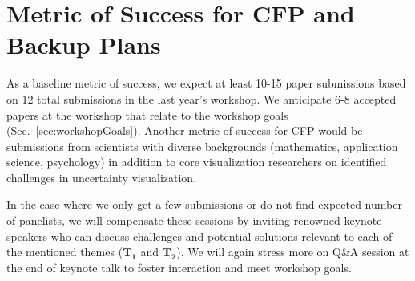 \section {Metric of Success for CFP and Backup Plans} \label{sec:backup}
As a baseline metric of success, we expect at least 10-15 paper submissions based on $12$ total submissions in the last year's workshop.  We anticipate 6-8 accepted papers at the workshop that relate to the workshop goals (Sec.~\ref{sec:workshopGoals}). Another metric of success for CFP would be submissions from scientists with diverse backgrounds (mathematics, application science, psychology) in addition to core visualization researchers on identified challenges in uncertainty visualization.

In the case where we only get a few submissions or do not find expected number of panelists, we will compensate these sessions by inviting renowned keynote speakers who can discuss challenges and potential solutions relevant to each of the mentioned themes ($\mathbf{T_1}$ and $\mathbf{T_2}$). We will again stress more on Q\&A session at the end of keynote talk to foster interaction and meet workshop goals. 





